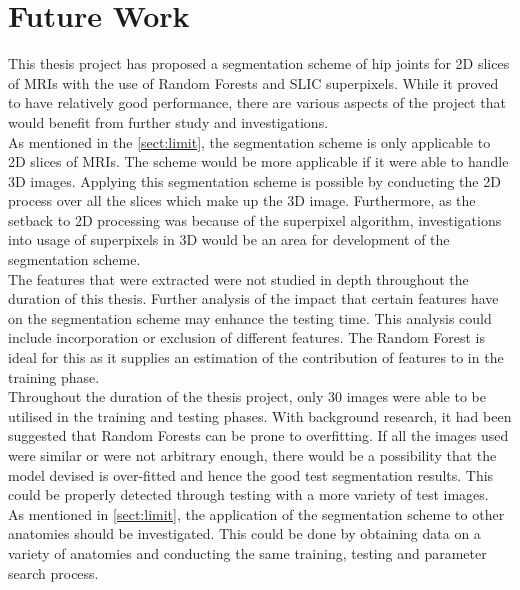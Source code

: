 \section{Future Work}
\label{sect:future}
This thesis project has proposed a segmentation scheme of hip joints for 2D slices of MRIs with the use of Random Forests and SLIC superpixels. While it proved to have relatively good performance, there are various aspects of the project that would benefit from further study and investigations. 
\\[1\baselineskip]
As mentioned in the \ref{sect:limit}, the segmentation scheme is only applicable to 2D slices of MRIs. The scheme would be more applicable if it were able to handle 3D images. Applying this segmentation scheme is possible by conducting the 2D process over all the slices which make up the 3D image. Furthermore, as the setback to 2D processing was because of the superpixel algorithm, investigations into usage of superpixels in 3D would be an area for development of the segmentation scheme.
\\[1\baselineskip]
The features that were extracted were not studied in depth throughout the duration of this thesis. Further analysis of the impact that certain features have on the segmentation scheme may enhance the testing time.  This analysis could include incorporation or exclusion of different features. The Random Forest is ideal for this as it supplies an estimation of the contribution of features to in the training phase.
\\[1\baselineskip]
Throughout the duration of the thesis project, only 30 images were able to be utilised in the training and testing phases. With background research, it had been suggested that Random Forests can be prone to overfitting. If all the images used were similar or were not arbitrary enough, there would be a possibility that the model devised is over-fitted and hence the good test segmentation results. This could be properly detected through testing with a more variety of test images.
\\[1\baselineskip]
As mentioned in \ref{sect:limit}, the application of the segmentation scheme to other anatomies should be investigated. This could be done by obtaining data on a variety of anatomies and conducting the same training, testing and parameter search process.